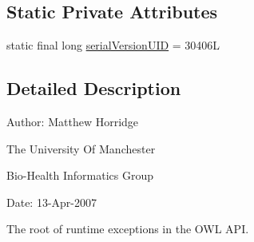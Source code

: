 \subsection*{Static Private Attributes}
\begin{DoxyCompactItemize}
\item 
static final long \hyperlink{classorg_1_1semanticweb_1_1owlapi_1_1model_1_1_o_w_l_runtime_exception_a9a76a5bfa1e106d0916884be678adf49}{serial\-Version\-U\-I\-D} = 30406\-L
\end{DoxyCompactItemize}


\subsection{Detailed Description}
Author\-: Matthew Horridge\par
 The University Of Manchester\par
 Bio-\/\-Health Informatics Group\par
 Date\-: 13-\/\-Apr-\/2007\par
\par


The root of runtime exceptions in the O\-W\-L A\-P\-I. 

